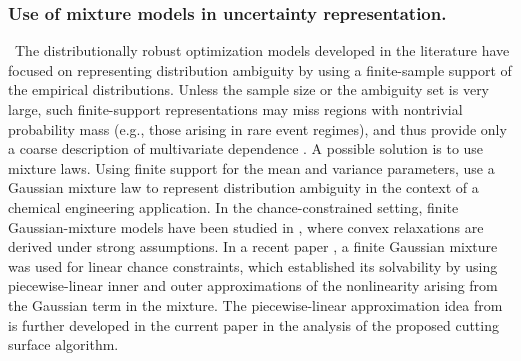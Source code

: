 \documentclass[opre,sglanonrev]{informs4}
\begin{document}
\subsubsection{Use of mixture models in uncertainty representation. }\, The distributionally robust optimization models developed in the literature have focused on representing distribution ambiguity by using a finite-sample support of the empirical distributions. Unless the sample size or the ambiguity set is very large, such finite-support representations may miss regions with nontrivial probability mass (e.g., those arising in rare event regimes), and thus provide only a coarse description of multivariate dependence \cite{shapiro_dentcheva_ruszczynski_2014,nemirovski_shapiro_2006,kleywegt_shapiro_homemdemello_2002,barrera_etal_2014_optimonline,blanchet_nam_zwart_2024}. A possible solution is to use mixture laws. Using finite support for the mean and variance parameters,  \cite{kammammettu2024distributionally} use a Gaussian mixture law to represent distribution ambiguity in the context of a chemical engineering application. In the chance-constrained setting, finite Gaussian-mixture models have been studied in \cite{fathabad2023asymptotically,hu2022chance,wei2024enhanced}, where convex relaxations are derived under strong assumptions. In a recent paper \cite{dey2025solving}, a finite Gaussian mixture was used for linear chance constraints, which established its solvability by using piecewise-linear inner and outer approximations of the nonlinearity arising from the Gaussian term in the mixture. The piecewise-linear approximation idea from \cite{dey2025solving} is further developed in the current paper in the analysis of the proposed cutting surface algorithm.  
\end{document}
